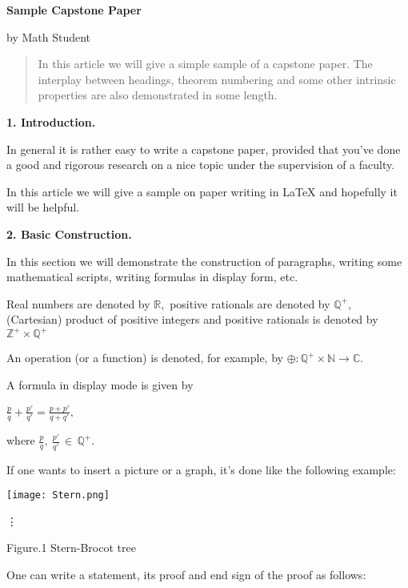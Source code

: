 \documentclass[11pt]{amsart}
\theoremstyle{plain}
\theoremstyle{definition}
\begin{document}
\centerline{\bf{\LARGE{Sample Capstone Paper}}}
\medskip
\centerline{\large{by Math Student}}
\bigskip

\begin{abstract}
In this article we will give a simple sample of a capstone paper. The interplay between headings, theorem numbering and some other intrinsic properties are also demonstrated in some length.
\end{abstract}

\centerline{\bf 1. Introduction.} 
In general it is rather easy to write a capstone paper, provided that you've done a good and rigorous research on a nice topic under the supervision of a faculty.

In this article we will give a sample on paper writing in LaTeX and hopefully it will be helpful.   
\bigskip

\centerline{\bf 2. Basic Construction.}
In this section we will demonstrate the construction of paragraphs, writing some mathematical scripts, writing formulas in display form, etc.
\medskip

Real numbers are denoted by $\mathbb R, $ positive rationals are denoted by $\mathbb{Q^+}, $ (Cartesian) product of positive integers and positive rationals is denoted by $\mathbb{Z^+}\times\mathbb{Q^+}$
\medskip

An operation (or a function) is denoted, for example, by
$\oplus:\mathbb{Q^+}\times\mathbb N \rightarrow \mathbb C . $ 
\medskip

A formula in display mode is given by
\begin{center}
$\frac{p}{q} + \frac{{p}'}{{q}'}=\frac{p+{p}'}{q+{q}'} ,$
\end{center}	
where $\frac{p}{q},\ \frac{{p}'}{{q}'}\, \in\,\mathbb{Q^+}.$  
\medskip
 
If one wants to insert a picture or a graph, it's done like the following example:

\begin{center}
\texttt{[image: Stern.png]}
\end{center}
\centerline{\vdots}

\centerline{Figure.1  Stern-Brocot tree}
\bigskip

One can write a statement, its proof and end sign of the proof as follows:
\end{document}
